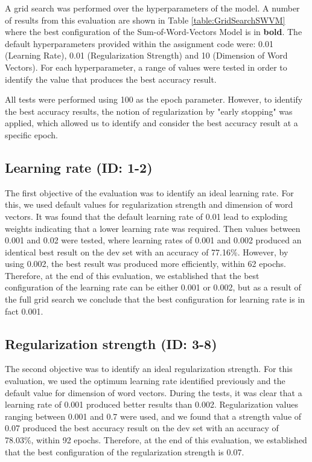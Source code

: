 \documentclass{article} %
\begin{document}
A grid search was performed over the hyperparameters of the model. A number of results from this evaluation are shown in Table \ref{table:GridSearchSWVM} where the best configuration of the Sum-of-Word-Vectors Model is in \textbf{bold}. The default hyperparameters provided within the assignment code were: 0.01 (Learning Rate), 0.01 (Regularization Strength) and 10 (Dimension of Word Vectors). For each hyperparameter, a range of values were tested in order to identify the value that produces the best accuracy result.

All tests were performed using 100 as the epoch parameter. However, to identify the best accuracy results, the notion of regularization by "early stopping" was applied, which allowed us to identify and consider the best accuracy result at a specific epoch.

\subsection*{Learning rate (ID: 1-2)}

The first objective of the evaluation was to identify an ideal learning rate. For this, we used default values for regularization strength and dimension of word vectors. It was found that the default learning rate of 0.01 lead to exploding weights indicating that a lower learning rate was required. Then values between 0.001 and 0.02 were tested, where learning rates of 0.001 and 0.002 produced an identical best result on the dev set with an accuracy of 77.16\%. However, by using 0.002, the best result was produced more efficiently, within 62 epochs. Therefore, at the end of this evaluation, we established that the best configuration of the learning rate can be either 0.001 or 0.002, but as a result of the full grid search we conclude that the best configuration for learning rate is in fact 0.001.

\subsection*{Regularization strength (ID: 3-8)}

The second objective was to identify an ideal regularization strength. For this evaluation, we used the optimum learning rate identified previously and the default value for dimension of word vectors. During the tests, it was clear that a learning rate of 0.001 produced better results than 0.002. Regularization values ranging between 0.001 and 0.7 were used, and we found that a strength value of 0.07 produced the best accuracy result on the dev set with an accuracy of 78.03\%, within 92 epochs. Therefore, at the end of this evaluation, we established that the best configuration of the regularization strength is 0.07.
\end{document}
